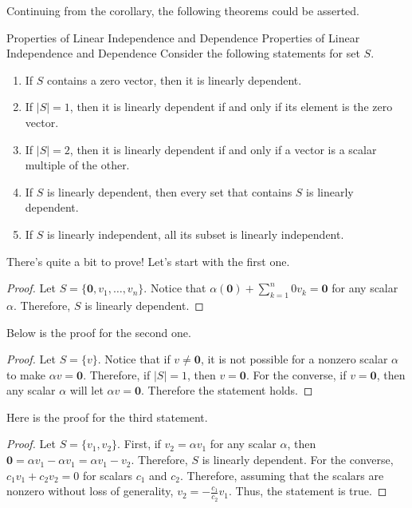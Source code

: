 \documentclass[../main.tex]{subfiles}
\begin{document}
Continuing from the corollary, the following theorems could be
asserted.

\begin{theorem}{Properties of Linear Independence and Dependence}
{Properties of Linear Independence and Dependence}
Consider the following statements for set $S$.
\begin{enumerate}[noitemsep]
\item
If $S$ contains a zero vector, then it is linearly dependent.
\item
If $|S| = 1$, then it is linearly dependent if and only if its
element is the zero vector.
\item
If $|S| = 2$, then it is linearly dependent if and only if a vector
is a scalar multiple of the other.
\item
If $S$ is linearly dependent, then every set that contains $S$ is
linearly dependent.
\item
If $S$ is linearly independent, all its subset is linearly
independent.
\end{enumerate}
\end{theorem}

There's quite a bit to prove! Let's start with the first one.

\begin{proof}
Let $S = \{ \mathbf{0}, v_1, \ldots, v_n \}$. Notice that
$\alpha(\mathbf{0}) + \sum_{k = 1}^n 0 v_k = \mathbf{0}$ for any
scalar $\alpha$. Therefore, $S$ is linearly dependent.
\end{proof}

Below is the proof for the second one.

\begin{proof}
Let $S = \{ v \}$. Notice that if $v \neq \mathbf{0}$, it is not
possible for a nonzero scalar $\alpha$ to make $\alpha v =
\mathbf{0}$. Therefore, if $|S| = 1$, then $v = \mathbf{0}$.
For the converse, if $v = \mathbf{0}$, then any scalar $\alpha$
will let $\alpha v = \mathbf{0}$. Therefore the statement holds.
\end{proof}

Here is the proof for the third statement.

\begin{proof}
Let $S = \{ v_1, v_2 \}$. First, if $v_2 = \alpha v_1$ for any scalar
$\alpha$, then $\mathbf{0} = \alpha v_1 - \alpha v_1 = \alpha v_1 -
v_2$. Therefore, $S$ is linearly dependent. For the converse,
$c_1 v_1 + c_2 v_2 = 0$ for scalars $c_1$ and $c_2$. Therefore,
assuming that the scalars are nonzero without loss of generality,
$v_2 = -\frac{c_1}{c_2} v_1$. Thus, the statement is true.
\end{proof}
\end{document}
